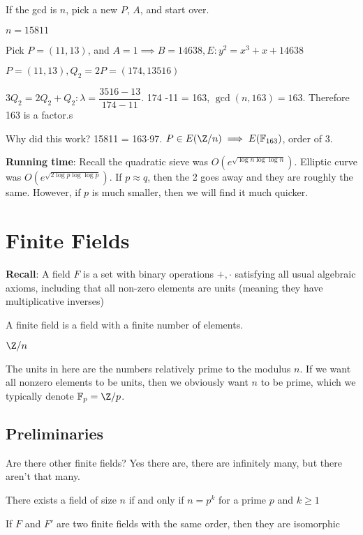 \documentclass[twoside, 10pt]{article}
\newcommand{\F}{\mathbb{F}}
\begin{document}
\begin{rmk}
    If the gcd is $n$, pick a new $P$, $A$, and start over.
\end{rmk}

\begin{exm*}
    $n = 15811$
\end{exm*}
Pick $P = (11, 13)$, and $A =1 \implies B = 14638, E: y^2 = x^3 + x + 14638$

$P = (11, 13), Q_2 = 2P = (174, 13516)$

$3Q_2 = 2Q_2 + Q_2: \lambda = \dfrac{3516 - 13}{174 -11}$. 174 -11 = 163, $\gcd(n, 163) = 163$. Therefore 163 is a factor.s

Why did this work? 15811 = 163$\cdot$97. $P \in E(\Z/n) \implies E(\F_{163})$, order of 3.

\textbf{Running time}: Recall the quadratic sieve was $O(e^{\sqrt{\log n \log\log n}})$. Elliptic curve was $O(e^{\sqrt{2\log p \log\log p}})$. If $p \approx q$, then the 2 goes away and they are roughly the same. However, if $p$ is much smaller, then we will find it much quicker.

\section{Finite Fields}
\textbf{Recall}: A field $F$ is a set with binary operations $+, \cdot$ satisfying all usual algebraic axioms, including that all non-zero elements are units (meaning they have multiplicative inverses)

A finite field is a field with a finite number of elements. 

\begin{exm*}
    $\Z/n$
\end{exm*}
The units in here are the numbers relatively prime to the modulus $n$. If we want all nonzero elements to be units, then we obviously want $n$ to be prime, which we typically denote $\F_p = \Z/p$. 

\subsection{Preliminaries} Are there other finite fields? Yes there are, there are infinitely many, but there aren't that many.

\begin{thm}
    There exists a field of size $n$ if and only if $n = p^k$ for a prime $p$ and $k \geq 1$
\end{thm}
\begin{thm}
    If $F$ and $F'$ are two finite fields with the same order, then they are isomorphic
\end{thm}
\end{document}
